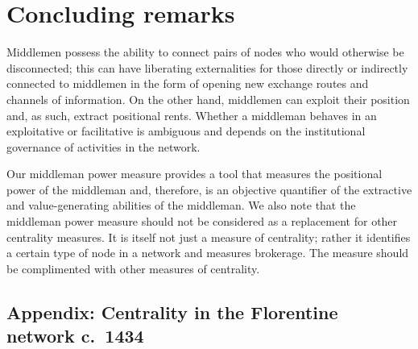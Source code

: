 \documentclass[11pt,fleqn]{article}
\begin{document}

\section{Concluding remarks}
\label{sec:Conclusion}

Middlemen possess the ability to connect pairs of nodes who would otherwise be disconnected; this can have liberating externalities for those directly or indirectly connected to middlemen in the form of opening new exchange routes and channels of information. On the other hand, middlemen can exploit their position and, as such, extract positional rents. Whether a middleman behaves in an exploitative or facilitative is ambiguous and depends on the institutional governance of activities in the network.

Our middleman power measure provides a tool that measures the positional power of the middleman and, therefore, is an objective quantifier of the extractive and value-generating abilities of the middleman. We also note that the middleman power measure should not be considered as a replacement for other centrality measures. It is itself not just a measure of centrality; rather it identifies a certain type of node in a network and measures brokerage. The measure should be complimented with other measures of centrality.


\singlespace




\newpage

\appendix

\begin{center}

\section*{Appendix: Centrality in the Florentine network c.~1434}
\label{AppendixA}

\end{center}
\end{document}
